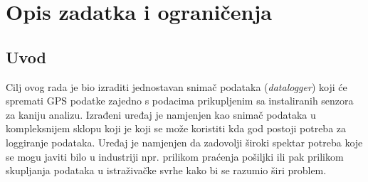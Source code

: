 \chapter{Opis zadatka i ograničenja}\label{OpisIOgranicenja}
\section{Uvod}
Cilj ovog rada je bio izraditi jednostavan snimač podataka (\textit{datalogger}) koji će spremati GPS podatke zajedno s podacima prikupljenim sa instaliranih senzora za kaniju analizu.
Izrađeni uređaj je namjenjen kao snimač podataka u kompleksnijem sklopu koji je koji se može koristiti kda god postoji potreba za loggiranje podataka.
Uređaj je namjenjen da zadovolji široki spektar potreba koje se mogu javiti bilo u industriji npr. prilikom praćenja pošiljki ili pak prilikom skupljanja podataka u istraživačke svrhe kako bi se razumio širi problem.